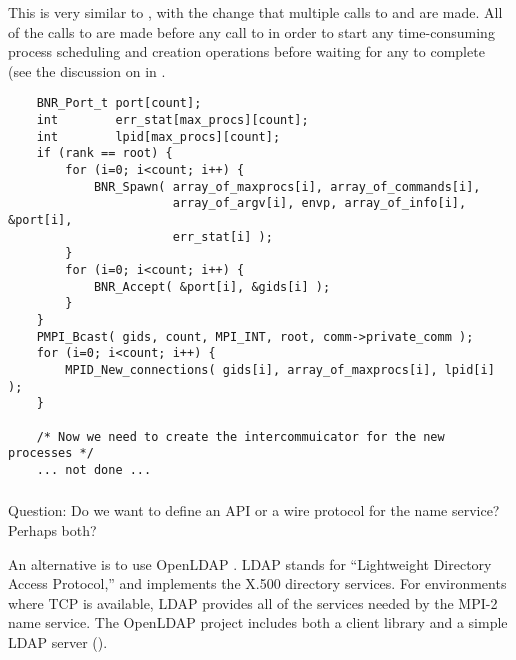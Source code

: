 \documentclass{article}
\begin{document}
This is very similar to , with the change that
multiple calls to  and  are made.
All of the calls to  are made before any call to
 in order to start any time-consuming process scheduling
and creation operations before waiting for any to complete (see the discussion
on  in .
\begin{verbatim}
    BNR_Port_t port[count];
    int        err_stat[max_procs][count];
    int        lpid[max_procs][count];
    if (rank == root) {
        for (i=0; i<count; i++) {
            BNR_Spawn( array_of_maxprocs[i], array_of_commands[i], 
                       array_of_argv[i], envp, array_of_info[i], &port[i], 
                       err_stat[i] );
        }
        for (i=0; i<count; i++) {
            BNR_Accept( &port[i], &gids[i] );
        }
    }
    PMPI_Bcast( gids, count, MPI_INT, root, comm->private_comm );
    for (i=0; i<count; i++) {
        MPID_New_connections( gids[i], array_of_maxprocs[i], lpid[i] );
    }

    /* Now we need to create the intercommuicator for the new processes */
    ... not done ...
\end{verbatim}

\subsubsection{}
Question:  Do we want to define an API or a wire protocol for the name
service?  Perhaps both?

An alternative is to use OpenLDAP \cite{openldap}.  LDAP stands for
``Lightweight Directory Access Protocol,'' and implements the X.500
directory services.  For environments where TCP is available, LDAP
provides all of the services needed by the MPI-2 name service.  The
OpenLDAP project includes both a client library and a simple LDAP
server ().  
\end{document}
